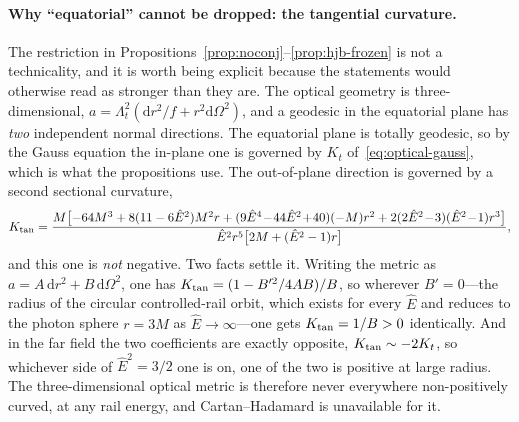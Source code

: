 \documentclass[12pt]{iopart}
\theoremstyle{plain}
\theoremstyle{definition}
\theoremstyle{remark}
\newcommand{\Ehat}{\hat E}
\newcommand{\dd}{\mathrm{d}}
\begin{document}
\paragraph{Why ``equatorial'' cannot be dropped: the tangential curvature.}
The restriction in Propositions~\ref{prop:noconj}--\ref{prop:hjb-frozen} is not a
technicality, and it is worth being explicit because the statements would
otherwise read as stronger than they are. The optical geometry is
three-dimensional, $a=\Lambda_t^2(\dd r^2/f+r^2\dd\Omega^2)$, and a geodesic in
the equatorial plane has \emph{two} independent normal directions. The equatorial
plane is totally geodesic, so by the Gauss equation the in-plane one is governed
by $K_t$ of~\eqref{eq:optical-gauss}, which is what the propositions use. The
out-of-plane direction is governed by a second sectional curvature,
\begin{equation}
    K_{\rm tan}=\frac{M\big[{-}64M^3+8(11-6\Ehat^2)M^2r
      +(9\Ehat^4\!-\!44\Ehat^2\!+\!40)(-M)r^2
      +2(2\Ehat^2\!-\!3)(\Ehat^2\!-\!1)r^3\big]}
      {\Ehat^2r^5\big[2M+(\Ehat^2-1)r\big]} ,
    \label{eq:ktan}
\end{equation}
and this one is \emph{not} negative. Two facts settle it. Writing the metric as
$a=A\,\dd r^2+B\,\dd\Omega^2$, one has $K_{\rm tan}=(1-B'^2/4AB)/B$, so wherever
$B'=0$---the radius of the circular controlled-rail orbit, which exists for every
$\Ehat$ and reduces to the photon sphere $r=3M$ as $\Ehat\to\infty$---one gets
$K_{\rm tan}=1/B>0$ identically. And in the far field the two coefficients are
exactly opposite, $K_{\rm tan}\sim-2K_t$, so whichever side of $\Ehat^2=3/2$ one
is on, one of the two is positive at large radius. The three-dimensional optical
metric is therefore never everywhere non-positively curved, at any rail energy,
and Cartan--Hadamard is unavailable for it.
\end{document}
